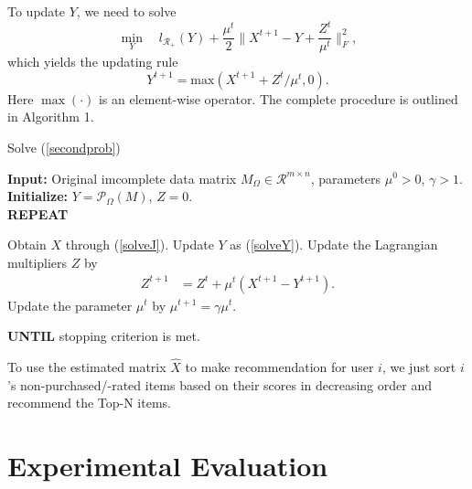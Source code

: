 \documentclass[letterpaper]{article}
\begin{document}
To update $Y$, we need to solve
\begin{equation}
\min_Y \quad l_{\mathcal{R}_+}(Y)+\frac{\mu^t}{2}\|X^{t+1}-Y+\frac{Z^t}{\mu^t}\|_F^2,
\end{equation}
which yields the updating rule
\begin{equation}
\label{solveY}
Y^{t+1}= \textrm{max}(X^{t+1}+Z^t/\mu^t,0).
\end{equation}
Here $\max(\cdot)$ is an element-wise operator. The complete procedure is outlined in Algorithm 1.
\begin{algorithm}[tb]
\small
\caption{Solve (\ref{secondprob})}
\label{alg:rankminimization}
{\bfseries Input:} Original imcomplete data matrix $M_\Omega\in \mathbf{\mathcal{R}}^{m\times n}$, parameters  $\mu^0>0$, $\gamma>1$.\\
{\bfseries Initialize:} $Y=\mathcal{P}_\Omega(M)$, $Z=0$.\\
{\bfseries REPEAT}
\begin{algorithmic}[1]
\STATE Obtain $X$ through (\ref{solveJ}).
\STATE Update $Y$ as (\ref{solveY}).
\STATE Update the Lagrangian multipliers $Z$ by
\begin{align*}
Z^{t+1}&=Z^{t}+\mu^t(X^{t+1}-Y^{t+1}).
\end{align*}
\STATE Update the parameter $\mu^t$ by $\mu^{t+1}=\gamma\mu^t$.
\end{algorithmic}
\textbf{ UNTIL} {stopping criterion is met.}
\end{algorithm}

To use the estimated matrix $\hat{X}$ to make recommendation for user $i$, we just sort $i$'s non-purchased/-rated items based on their scores in decreasing order and recommend the Top-N items.

\section{Experimental Evaluation}
\end{document}
